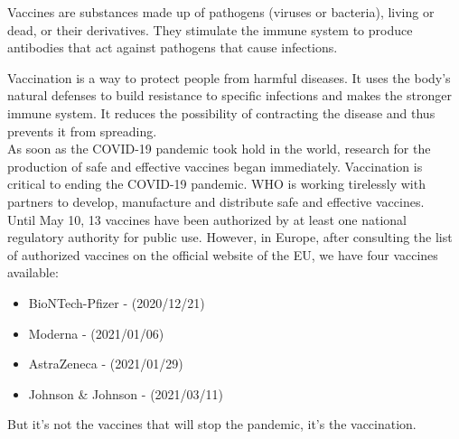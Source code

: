 Vaccines are substances made up of pathogens (viruses or bacteria), living or dead, or their derivatives. They stimulate the immune system to produce antibodies that act against pathogens that cause infections.

Vaccination is a way to protect people from harmful diseases. It uses the body's natural defenses to build resistance to specific infections and makes the
 stronger immune system.
It reduces the possibility of contracting the disease and thus prevents it from spreading.
\\
As soon as the COVID-19 pandemic took hold in the world, research for the production of safe and effective vaccines began immediately. Vaccination is critical to ending the COVID-19 pandemic. WHO is working tirelessly with partners to develop, manufacture and distribute safe and effective vaccines.
\\
Until May 10, 13 vaccines have been authorized by at least one national regulatory authority for public use. However, in Europe, after consulting the list of authorized vaccines on the \cite {EU} official website of the \ac{EU}, we have four vaccines available: 
\begin{itemize}
    \item BioNTech-Pfizer - (2020/12/21)
    \item Moderna - (2021/01/06)
    \item AstraZeneca - (2021/01/29)
    \item Johnson \& Johnson - (2021/03/11)
\end{itemize}
But it's not the vaccines that will stop the pandemic, it's the vaccination. 
\\


